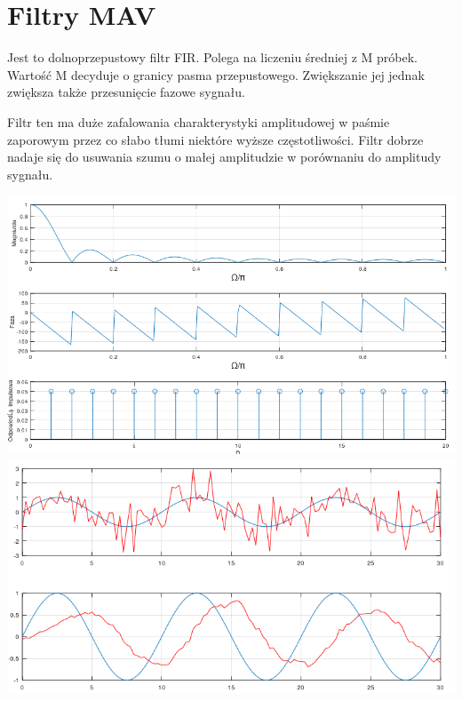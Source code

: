 \documentclass[11pt]{article}
\begin{document}
\section{Filtry MAV}
Jest to dolnoprzepustowy filtr FIR. Polega na liczeniu średniej z M próbek. Wartość M decyduje o granicy pasma przepustowego. Zwiększanie jej jednak zwiększa także przesunięcie fazowe sygnału.

Filtr ten ma duże zafalowania charakterystyki amplitudowej w paśmie zaporowym przez co słabo tłumi niektóre wyższe częstotliwości. Filtr dobrze nadaje się do usuwania szumu o małej amplitudzie w porównaniu do amplitudy sygnału. 
\begin{center}
\includegraphics[width=15cm]{mav_ch.png}
\includegraphics[width=15cm]{mav_g.png}
\end{center}
\end{document}
